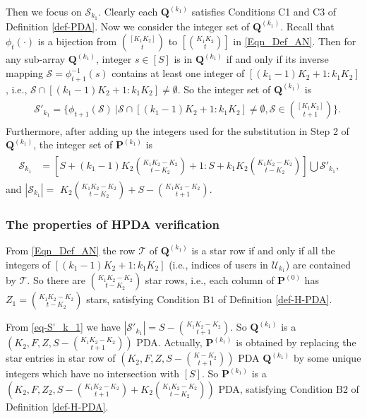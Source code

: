 \documentclass[onecolumn,10pt]{IEEEtran}
\theoremstyle{mythm}
\begin{document}
{Then we focus on $\mathcal{S}_{k_1}$. Clearly each $\mathbf{Q}^{(k_1)}$ satisfies Conditions C1 and C3 of Definition \ref{def-PDA}. Now we consider the integer set of $\mathbf{Q}^{(k_1)}$. Recall that $\phi_t(\cdot)$ is a bijection from  $\binom{[K_1K_2]}{t}$ to $[\binom{K_1K_2}{t}]$ in \eqref{Eqn_Def_AN}. Then for any sub-array $\mathbf{Q}^{(k_1)}$, integer $s\in [S]$ is in $\mathbf{Q}^{(k_1)}$ if and only if its inverse mapping $\mathcal{S}=\phi^{-1}_{t+1}(s)$ contains at least one integer of $[(k_1-1)K_2+1:k_1K_2]$, i.e., $\mathcal{S}\cap[(k_1-1)K_2+1:k_1K_2]\neq \emptyset$. So the integer set of $\mathbf{Q}^{(k_1)}$ is
\begin{eqnarray}
\label{eq-S'_k_1}
\begin{split}
&\mathcal{S}'_{k_1}=\bigg\{\phi_{t+1}(\mathcal{S})\ |\mathcal{S}\cap[(k_1-1)K_2+1:k_1K_2]\neq\emptyset,
\mathcal{S}\in {[K_1K_2]\choose t+1}\bigg\}.
\end{split}
\end{eqnarray}
Furthermore, after adding up the integers used for the substitution in Step 2 of $\mathbf{Q}^{(k_1)}$, the integer set of $\mathbf{P}^{(k_1)}$ is
\begin{eqnarray}
\label{eq-S_k_1}
\begin{split}
\mathcal{S}_{k_1}&=\left[S+(k_1-1)K_2{K_1K_2-K_2\choose t-K_2}+1:S+
k_1K_2{K_1K_2-K_2\choose t-K_2}\right] \bigcup \mathcal{S}'_{k_1},&
\end{split}
\end{eqnarray}and $|\mathcal{S}_{k_1}| =$ $ K_2{K_1K_2-K_2\choose t-K_2}+S-{K_1K_2-K_2\choose t+1}$.


\subsubsection{The properties of HPDA verification}
From \eqref{Eqn_Def_AN} the row $\mathcal{T}$ of $\mathbf{Q}^{(k_1)}$ is a star row if and only if all the integers of $[(k_1-1)K_2+1:k_1K_2]$ (i.e.,   indices of users in $\mathcal{U}_{k_1}$) are contained by $\mathcal{T}$. So there are ${K_1K_2-K_2\choose t-K_2}$ star rows, i.e., each column of $\mathbf{P}^{(0)}$ has $Z_1={K_1K_2-K_2\choose t-K_2}$ stars, satisfying  Condition B$1$ of Definition \ref{def-H-PDA}.

From \eqref{eq-S'_k_1} we have
$|\mathcal{S}'_{k_1}|=S-{K_1K_2-K_2\choose t+1}$. So $\mathbf{Q}^{(k_1)}$ is a $(K_2,F,Z,S-{K_1K_2-K_2\choose t+1})$ PDA. Actually, $\mathbf{P}^{(k_1)}$ is obtained by replacing the star entries in star row of $(K_2,F,Z,S-{K-K_2\choose t+1})$ PDA $\mathbf{Q}^{(k_1)}$ by some unique integers which have no intersection with $[S]$. So $\mathbf{P}^{(k_1)}$ is a $(K_2,F,Z_2,S-{K_1K_2-K_2\choose t+1}+K_2{K_1K_2-K_2\choose t-K_2})$ PDA, satisfying Condition B$2$ of Definition \ref{def-H-PDA}.

}
\end{document}
